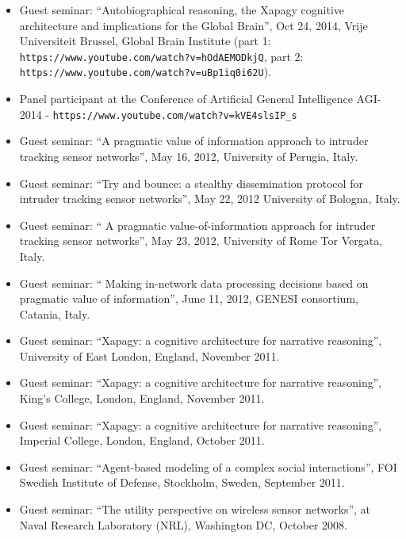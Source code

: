 \begin{itemize}
\item Guest seminar: ``Autobiographical reasoning, the Xapagy cognitive architecture and implications for the Global Brain'', Oct 24, 2014, Vrije Universiteit Brussel, Global Brain Institute (part 1: {\tt \small https://www.youtube.com/watch?v=hOdAEMODkjQ}, part 2: {\tt https://www.youtube.com/watch?v=uBp1iq0i62U}).

\item Panel participant at the Conference of Artificial General Intelligence AGI-2014 - \verb+https://www.youtube.com/watch?v=kVE4slsIP_s+

\item Guest seminar: ``A pragmatic value of information approach to intruder tracking sensor networks'', May 16, 2012, University of Perugia, Italy.

\item Guest seminar: ``Try and bounce: a stealthy dissemination protocol for intruder tracking sensor networks'', May 22, 2012 University of Bologna, Italy.

\item Guest seminar: ``	A pragmatic value-of-information approach for intruder tracking sensor networks'', May 23, 2012, University of Rome Tor Vergata, Italy.

\item Guest seminar: ``	Making in-network data processing decisions based on pragmatic value of information'', June 11, 2012, GENESI consortium, Catania, Italy.

\item Guest seminar: ``Xapagy: a cognitive architecture for narrative reasoning'', University of East London, England, November 2011.

\item Guest seminar: ``Xapagy: a cognitive architecture for narrative reasoning'', King's College, London, England, November 2011.

\item Guest seminar: ``Xapagy: a cognitive architecture for narrative reasoning'', Imperial College, London, England, October 2011.

\item Guest seminar: ``Agent-based modeling of a complex social interactions'', FOI Swedish Institute of Defense, Stockholm, Sweden, September 2011.

\item Guest seminar: ``The utility perspective on wireless sensor networks'', at Naval Research Laboratory (NRL), Washington DC, October 2008.


\end{itemize}
